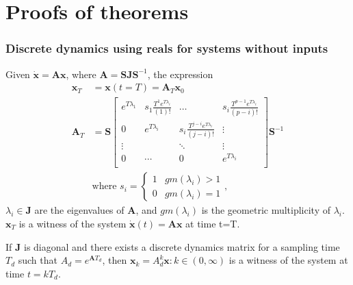 \documentclass[sigconf]{llncs}
\newcommand{\mat}[1]{\boldsymbol{#1}}
\renewcommand{\vec}[1]{\boldsymbol{#1}}
\begin{document}
\section{Proofs of theorems}
\setcounter{theorem}{0}
\setcounter{corollary}{0}
 \subsubsection{Discrete dynamics using reals for systems without inputs}\label{asec:real_discrete_no_inputs}
 \begin{theorem}
 Given $\dot{\vec{x}}=\mat{A}\vec{x}$, where $\mat{A}=\mat{S}\mat{J}\mat{S}^{-1}$, the expression
 \begin{align}
 \vec{x}_T&=\vec{x}(t=T)=\mat{A}_{T}\vec{x}_0\\
 \mat{A}_{T}&= \mat{S}
 \left [ \begin{array}{cccc}
 e^{T\lambda_1}  & s_1\frac{T^{1}e^{T\lambda_i}}{(1)!} & \hdots  & s_i\frac{T^{p-1}e^{T\lambda_i}}{(p-i)!} \\
0 & e^{T\lambda_i}  & s_i\frac{T^{j-i}e^{T\lambda_i}}{(j-i)!} & \vdots \\
\vdots & & \ddots & \vdots \\
0 & \cdots & 0  &e^{T\lambda_i} \\
\end{array} \right ]
 \mat{S}^{-1}
 \label{appendix:continuous_tube_dyn}\\
 &\text{where } s_i=\left\{\begin{array}{cc}1&gm(\lambda_i)>1\\0&gm(\lambda_i)=1\end{array}\right.,\nonumber
 \end{align}
$\lambda_i \in \mat{J}$ are the eigenvalues of $\mat{A}$, and $gm(\lambda_i)$ is the geometric multiplicity of $\lambda_i$.  $\vec{x}_T$ is a witness of the system $\dot{\vec{x}}(t)=\mat{A}\vec{x}$ at time t=T.
 \end{theorem}
 \begin{corollary}
 If $\mat{J}$ is diagonal and there exists a discrete dynamics matrix for a sampling time $T_d$ such that $A_d=e^{\mat{A} T_d}$, then $\vec{x}_k=A_d^k\vec{x} : k \in (0,\infty)$ is a witness of the system at time $t=kT_d$.
 \end{corollary}
\end{document}
